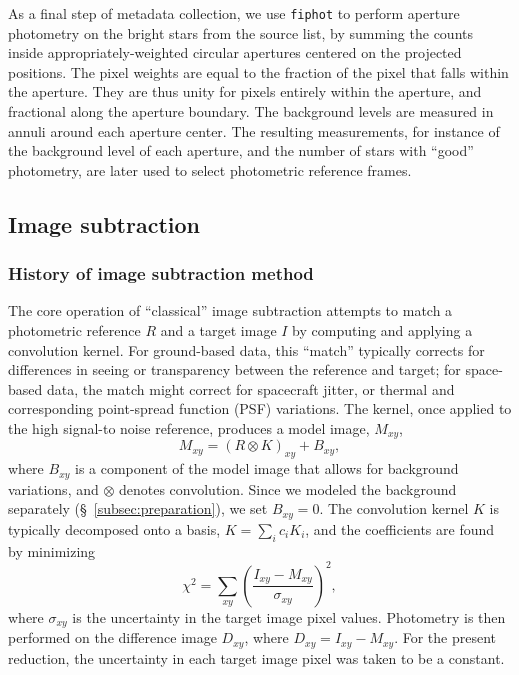 \documentclass[12pt,twocolumn,tighten]{aastex62}
\begin{document}
As a final step of metadata collection, we use \texttt{fiphot}
to perform aperture photometry on the
bright stars from the
source list, by summing the counts inside appropriately-weighted
circular apertures centered on the projected positions. 
The pixel weights are equal to the fraction of the pixel
that falls within the aperture.  They are thus unity for pixels
entirely within the aperture, and fractional along the aperture
boundary. %
The background levels are measured in annuli around each aperture
center. 
The resulting measurements, for instance of the background level of
each aperture, and the number of stars with ``good'' photometry,
are later used to select photometric reference frames.


\subsection{Image subtraction}
\label{subsec:imagesubtraction}

\subsubsection{History of image subtraction method}
The core operation of ``classical'' image subtraction
attempts to match a photometric reference $R$ and a target image $I$ by 
computing and applying a convolution kernel.
For ground-based data, this ``match'' typically corrects for
differences in seeing or transparency between the reference and
target; for space-based data, the match might correct for spacecraft
jitter, or thermal and corresponding point-spread function (PSF)
variations.
The kernel, once applied to the high signal-to noise reference,
produces a model image, $M_{xy}$,
\begin{equation}
    M_{xy} = (R \otimes K)_{xy} + B_{xy},
    \label{eq:imagemodel}
\end{equation}
where $B_{xy}$ is a component of the model image that allows for
background variations, and $\otimes$ denotes convolution.
Since we modeled the background separately (\S~\ref{subsec:preparation}),
we set $B_{xy}=0$.
The convolution kernel $K$ is typically decomposed onto a
basis, $K = \sum_i c_i K_i$, and the coefficients are found
by minimizing
\begin{equation}
    \chi^2 = \sum_{xy} \left( \frac{I_{xy} - M_{xy}}{\sigma_{xy}} \right)^2,
    \label{eq:chisq_conv}
\end{equation}
where $\sigma_{xy}$ is the uncertainty in the target image pixel values.
Photometry is then performed on the difference image $D_{xy}$, where
$D_{xy} = I_{xy} - M_{xy}$.
For the present reduction, the uncertainty in each target image pixel was
taken to be a constant.	
\end{document}
